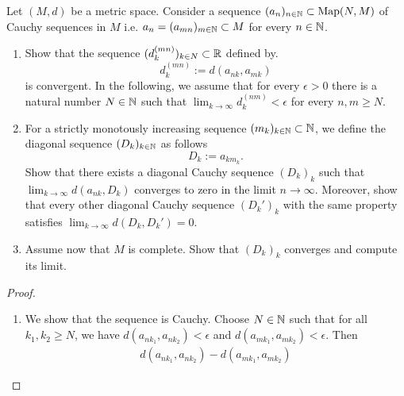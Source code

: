 \begin{Problem}
	Let $(M, d)$ be a metric space. Consider a sequence $(a_n)_{n\in \mathbb{N}}\subset \text{Map}(N, M)$ of Cauchy sequences in $M$ i.e. $a_n=(a_{mn})_{m\in \mathbb{N}}\subset M$ for every $n\in \mathbb{N}$.
	\begin{enumerate}
		\item Show that the sequence $(d_k^{(mn)})_{k\in N}\subset \mathbb{R}$ defined by.
			\[
				d_k^{(mn)}:=d(a_{nk}, a_{m k })
			\]
			is convergent.
			In the following, we assume that for every $\epsilon>0$ there is a natural number $N\in \mathbb{N}$ such that $\lim_{k \to \infty} d_k^{(nm)}<\epsilon$ for every  $n,m\ge N$.
		\item For a strictly monotously increasing sequence $(m_k)_{k\in \mathbb{N}} \subset \mathbb{N}$, we define the diagonal sequence $ (D_k)_{k\in \mathbb{N}}$ as follows
			\[
				D_k:=a_{k m_k}
			.\] 
			Show that there exists a diagonal Cauchy sequence $(D_k)_k$ such that $\lim_{k \to \infty} d(a_{nk}, D_k)$ converges to zero in the limit $n\to \infty$. Moreover, show that every other diagonal Cauchy sequence $(D_k')_k$ with the same property satisfies $\lim_{k \to \infty} d(D_k, D_k')=0$.
		\item Assume now that $M$ is complete. Show that $(D_k)_k$ converges and compute its limit.
	\end{enumerate}
\end{Problem}
\begin{proof}
	\begin{enumerate}
		\item We show that the sequence is Cauchy. Choose $N\in \mathbb{N}$ such that for all $k_1,k_2\ge N$, we have $d(a_{nk_1}, a_{nk_2})<\epsilon$ and $d(a_{m k_1}, a_{m k_2})<\epsilon$. Then
			\begin{align*}
				d(a_{nk_1}, a_{nk_2})-d(a_{m k_1}, a_{m k_2})
			\end{align*}
	\end{enumerate}
\end{proof}

